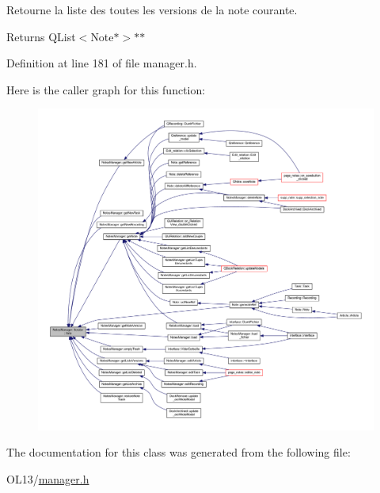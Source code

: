Retourne la liste des toutes les versions de la note courante. 

\begin{DoxyReturn}{Returns}
Q\+List$<$\+Note$\ast$$>$$\ast$$\ast$ 
\end{DoxyReturn}


Definition at line 181 of file manager.\+h.

Here is the caller graph for this function\+:
\nopagebreak
\begin{figure}[H]
\begin{center}
\leavevmode
\includegraphics[width=350pt]{class_notes_manager_1_1_iterator_a99e3eb098c3b5c7b3041731d10a18c88_icgraph}
\end{center}
\end{figure}


The documentation for this class was generated from the following file\+:\begin{DoxyCompactItemize}
\item 
O\+L13/\hyperlink{manager_8h}{manager.\+h}\end{DoxyCompactItemize}
